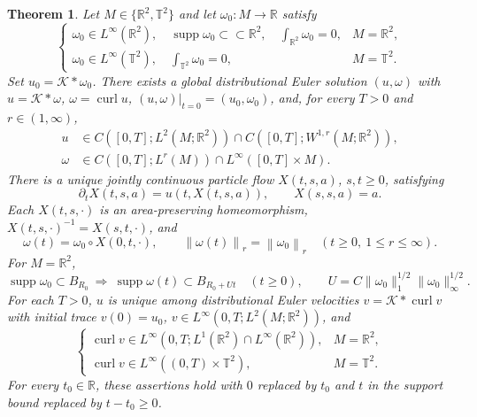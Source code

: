 \documentclass[11pt]{amsart}
\newtheorem{theorem}{Theorem}[section]
\theoremstyle{remark}
\numberwithin{equation}{section}
\newcommand{\norm}[1]{\left\lVert#1\right\rVert}
\newcommand{\R}{\mathbb R}
\newcommand{\T}{\mathbb T}
\begin{document}
\begin{theorem}
\label{bv:wellposed}
Let $M\in\{\R^2,\T^2\}$ and let $\omega_0:M\to\R$ satisfy
\[
 \begin{cases}
 \omega_0\in L^\infty(\R^2),\quad
 \operatorname{supp}\omega_0\subset\subset\R^2,\quad \int_{\R^2}\omega_0=0,
       &M=\R^2,\\
 \omega_0\in L^\infty(\T^2),\quad \int_{\T^2}\omega_0=0,
       &M=\T^2.
 \end{cases}
\]
Set $u_0=\mathcal K*\omega_0$. There exists a global distributional
Euler solution $(u,\omega)$ with $u=\mathcal K*\omega$,
$\omega=\operatorname{curl}u$, $(u,\omega)|_{t=0}=(u_0,\omega_0)$,
and, for every $T>0$ and $r\in(1,\infty)$,
\begin{equation}\label{bv:regularity}
 \begin{split}
 u&\in C([0,T];L^2(M;\R^2))\cap C([0,T];W^{1,r}(M;\R^2)),\\
 \omega&\in C([0,T];L^r(M))\cap L^\infty([0,T]\times M).
 \end{split}
\end{equation}
There is a unique jointly continuous particle flow $X(t,s,a)$,
$s,t\ge0$, satisfying
\[
 \partial_tX(t,s,a)=u(t,X(t,s,a)),\qquad X(s,s,a)=a.
\]
Each $X(t,s,\cdot)$ is an area-preserving homeomorphism,
$X(t,s,\cdot)^{-1}=X(s,t,\cdot)$, and
\begin{equation}\label{bv:transport}
 \omega(t)=\omega_0\circ X(0,t,\cdot),\qquad
 \norm{\omega(t)}_r=\norm{\omega_0}_r
 \quad(t\ge0,\ 1\le r\le\infty).
\end{equation}
For $M=\R^2$,
\[
 \operatorname{supp}\omega_0\subset B_{R_0}
 \ \Longrightarrow\
 \operatorname{supp}\omega(t)\subset B_{R_0+Ut}\quad(t\ge0),\qquad
 U=C\|\omega_0\|_1^{1/2}\|\omega_0\|_\infty^{1/2}.
\]
For each $T>0$, $u$ is unique among distributional Euler velocities
$v=\mathcal K*\operatorname{curl}v$ with initial trace $v(0)=u_0$,
$v\in L^\infty(0,T;L^2(M;\R^2))$, and
\[
 \begin{cases}
 \operatorname{curl}v\in L^\infty(0,T;L^1(\R^2)\cap L^\infty(\R^2)),
       &M=\R^2,\\
 \operatorname{curl}v\in L^\infty((0,T)\times\T^2),&M=\T^2.
 \end{cases}
\]
For every $t_0\in\R$, these assertions hold with $0$ replaced by
$t_0$ and $t$ in the support bound replaced by $t-t_0\ge0$.
\end{theorem}
\end{document}
